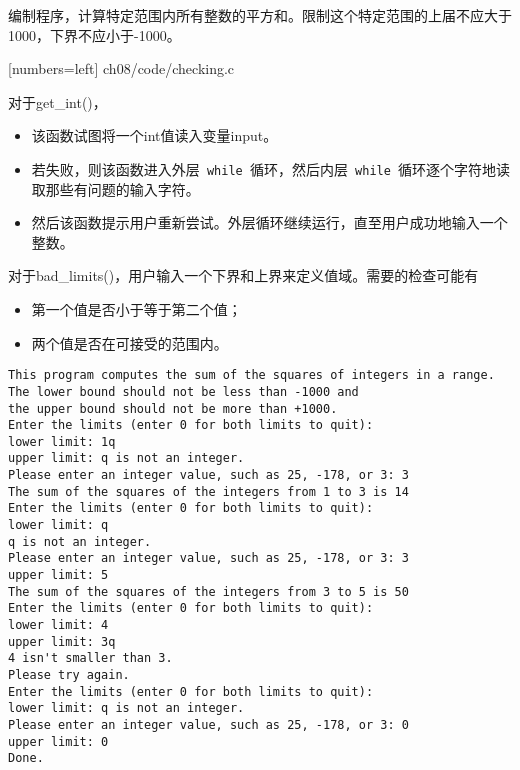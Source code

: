 \begin{frame}[fragile]\ft{\secname}
编制程序，计算特定范围内所有整数的平方和。限制这个特定范围的上届不应大于1000，下界不应小于-1000。
\end{frame}


\begin{frame}\ft{\secname}

[numbers=left]
{ch08/code/checking.c}
\end{frame}

\begin{frame}[fragile]\ft{\secname}
  对于{\tf get\_int()}，
\begin{itemize}
\item 
该函数试图将一个int值读入变量input。\\[0.1in]
\item 
若失败，则该函数进入外层\lstinline| while |循环，然后内层\lstinline| while |循环逐个字符地读取那些有问题的输入字符。\\[0.1in]
\item
然后该函数提示用户重新尝试。外层循环继续运行，直至用户成功地输入一个整数。
\end{itemize}

\end{frame}

\begin{frame}[fragile]\ft{\secname}
对于{\tf bad\_limits()}，用户输入一个下界和上界来定义值域。需要的检查可能有 \vspace{.1in}
\begin{itemize}
\item 第一个值是否小于等于第二个值；\\[0.1in]
\item 两个值是否在可接受的范围内。
\end{itemize}
\end{frame}

\begin{frame}\ft{\secname}
  \begin{lstlisting}
This program computes the sum of the squares of integers in a range.
The lower bound should not be less than -1000 and
the upper bound should not be more than +1000.
Enter the limits (enter 0 for both limits to quit):
lower limit: 1q
upper limit: q is not an integer.
Please enter an integer value, such as 25, -178, or 3: 3
The sum of the squares of the integers from 1 to 3 is 14
Enter the limits (enter 0 for both limits to quit):
lower limit: q
q is not an integer.
Please enter an integer value, such as 25, -178, or 3: 3
upper limit: 5
The sum of the squares of the integers from 3 to 5 is 50
Enter the limits (enter 0 for both limits to quit):
lower limit: 4
upper limit: 3q
4 isn't smaller than 3.
Please try again.
Enter the limits (enter 0 for both limits to quit):
lower limit: q is not an integer.
Please enter an integer value, such as 25, -178, or 3: 0
upper limit: 0
Done.
\end{lstlisting}
\end{frame}



